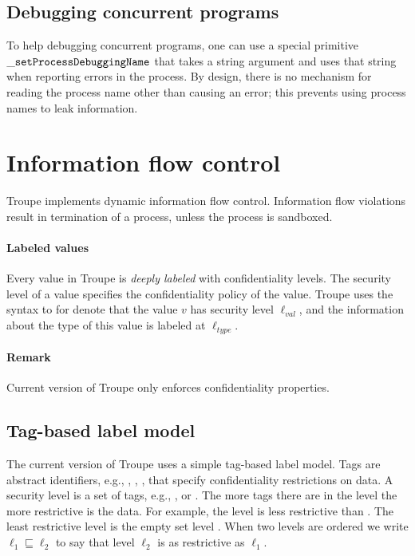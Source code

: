 \subsection{Debugging concurrent programs}
To help debugging concurrent programs, one can use a special primitive ${\mathtt{\_setProcessDebuggingName}}$ that
takes a string argument and uses that string when reporting errors in the process. By design, there is no mechanism
for reading the process name other than causing an error; this prevents using process names to leak information.

\section{Information flow control}
\label{sec:infoflow}
Troupe implements dynamic information flow control. 
%
Information flow violations result in termination of a process,
unless the process is sandboxed. 

\paragraph{Labeled values}
Every value in Troupe is \emph{deeply labeled} with confidentiality
levels. The security level of 
a value specifies the confidentiality policy of the 
value. Troupe uses the syntax  to 
for denote that the value $\mathit{v}$ has security level 
$\mathit{\ell_{\mathit{val}}}$, and the information about the type of this value is labeled at $\mathit{\ell_{\mathit{type}}}$.






\paragraph{Remark}
Current version of Troupe only enforces confidentiality 
properties.

\subsection{Tag-based label model}
The current version of Troupe uses a simple tag-based label model.
Tags are abstract identifiers, e.g., , , ,
that specify confidentiality restrictions on data. 
A security level is a set of tags, e.g., 
, or 
.
The more tags there are in the level the more restrictive is the data. 
For example, the level 
 is less restrictive than 
. The least restrictive level is the 
empty set level \lev{}. When two levels are ordered we write 
$\ell_1 \sqsubseteq \ell_2$ to say that level $\ell_2$ is as restrictive 
as $\ell_1$.



